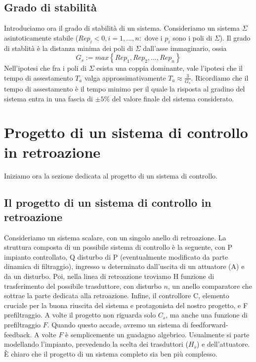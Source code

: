 \documentclass[11pt]{article}
\begin{document}
\subsection{Grado di stabilità}
Introduciamo ora il grado di stabilità di un sistema. Consideriamo un sistema $\Sigma$ asintoticamente stabile ($Re p_i <0, i=1,\dots,n:$ dove i $p_i$ sono i poli di $\Sigma$). Il grado di stablità è la distanza minima dei poli di $\Sigma$ dall'asse immaginario, ossia
\begin{displaymath}
    G_s := max\left\{Rep_1, Re p_2, ..., Re p_n\right\}
\end{displaymath}
Nell'ipotesi che fra i poli di $\Sigma$ esista una coppia dominante, vale l'ipotesi che il tempo di assestamento $T_a$ valga approssimativamente $T_a \approx \frac{3}{G_s}$. Ricordiamo che il tempo di assestamento è il tempo minimo per il quale la risposta al gradino del sistema entra in una fascia di $\pm 5\%$ del valore finale del sistema considerato.
\section{Progetto di un sistema di controllo in retroazione}
Iniziamo ora la sezione dedicata al progetto di un sistema di controllo.
\subsection{Il progetto di un sistema di controllo in retroazione}
Consideriamo un sistema scalare, con un singolo anello di retroazione. La struttura composta di un possibile sistema di controllo è la seguente, con P impianto controllato, Q disturbo di P (eventualmente modificato da parte dinamica di filtraggio), ingresso $u$ determinato dall'uscita di un attuatore (A) e da un disturbo. Poi, nella linea di retroazione troviamo H funzione di trasferimento del possibile trasduttore, con disturbo $n$, un anello comparatore che sottrae la parte dedicata alla retroazione. Infine, il controllore C, elemento cruciale per la buona riuscita del sistema e protagonista del nostro progetto, e F prefiltraggio. A volte il progetto non riguarda solo $C_s$, ma anche una funzione di prefiltraggio $F$. Quando questo accade, avremo un sistema di feedforward-feedback. A volte $F$ è semplicemente un guadagno algebrico. Usualmente si parte modellando l'impianto, prevedendo la scelta dei trasduttori ($H_s$) e dell'attuatore.
È chiaro che il progetto di un sistema completo sia ben più complesso.
\end{document}
